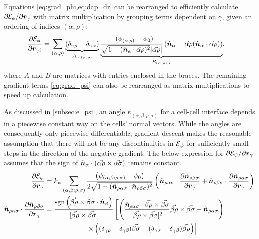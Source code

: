 Equations \cref{eq:grad_phi,eq:dap_dr} can be rearranged to efficiently calculate $\partial\mathcal{E}_\phi/\partial\bm{r}_\gamma$ with matrix multiplication by grouping terms dependent on $\gamma$, given an ordering of indices $(\alpha,\rho)$:
\begin{align}
	\frac{\partial\mathcal{E}_\phi}{\partial\bm{r}_{\gamma i}} &= \sum_{(\alpha,\rho)} \underbrace{(\delta_{\gamma\rho} - \delta_{\gamma\alpha})}_{A_{\gamma,(\alpha,\rho)}} \underbrace{\frac{-(\phi_{(\alpha,\rho)} - \phi_0)}{\sqrt{1-(\hat{\bm{n}}_\alpha \cdot \hat{\alpha\rho})^2} |\vec{\alpha\rho}|} \left(\hat{\bm{n}}_\alpha - \hat{\alpha\rho} (\hat{\bm{n}}_\alpha \cdot \hat{\alpha\rho}) \right)}_{B_{(\alpha,\rho), i}}, \label{eq:grad_phi_mx}
\end{align}
where $A$ and $B$ are matrices with entries enclosed in the braces. 
The remaining gradient terms \cref{eq:grad_psi} can also be rearranged as matrix multiplications to speed up calculation.

As discussed in \ref{subsec:e_psi}, an angle $\psi_{(\alpha, \beta: \rho, \sigma)}$ for a cell-cell interface depends in a piecewise constant way on the cells' normal vectors. While the angles are consequently only piecewise differentiable, gradient descent makes the reasonable assumption that there will not be any discontinuities in $\mathcal{E}_\psi$ for sufficiently small steps in the direction of the negative gradient. The below expression for $\partial \mathcal{E}_\psi / \partial \bm{r}_\gamma$ assumes that the sign of $\hat{\bm{n}}_\alpha \cdot (\vec{\alpha\rho}\times \vec{\alpha\sigma})$ remains constant.
\begin{align}
	\frac{\partial \mathcal{E}_\psi}{\partial \bm{r}_\gamma} &= k_\psi \sum_{(\alpha,\beta: \rho,\sigma)} \frac{\left(\psi_{(\alpha,\beta:\rho,\sigma)} - \psi_0 \right)}{2\sqrt{1 - (\hat{\bm{n}}_{\rho\alpha\sigma}\cdot \hat{\bm{n}}_{\rho\beta\sigma})^2}} \left(\hat{\bm{n}}_{\rho\alpha\sigma} \cdot \frac{\partial \hat{\bm{n}}_{\rho\beta\sigma}}{\partial \bm{r}_\gamma} + \hat{\bm{n}}_{\rho\beta\sigma} \cdot \frac{\partial \hat{\bm{n}}_{\rho\alpha\sigma}}{\partial \bm{r}_\gamma} \right) \nonumber \\
	\hat{\bm{n}}_{\rho\alpha\sigma} \cdot \frac{\partial \hat{\bm{n}}_{\rho\beta\sigma}}{\partial \bm{r}_\gamma} &= \frac{\operatorname{sgn} \left(\vec{\beta\rho} \times \vec{\beta\sigma} \cdot \hat{\bm{n}}_\beta \right)}{|\vec{\beta\rho} \times \vec{\beta\sigma}|} \left[ \left(\frac{\hat{\bm{n}}_{\rho\alpha\sigma} \cdot \vec{\beta\rho}\times\vec{\beta\sigma}}{|\vec{\beta\rho}\times\vec{\beta\sigma}|^2} \vec{\beta\rho}\times\vec{\beta\sigma} - \hat{\bm{n}}_{\rho\alpha\sigma} \right) \right. \nonumber \\
	&\qquad\qquad\qquad \left. \times \left( (\delta_{\gamma\rho} - \delta_{\gamma\beta}) \vec{\beta\sigma} - (\delta_{\gamma\sigma} - \delta_{\gamma\beta}) \vec{\beta\rho} \right) \right] \label{eq:grad_psi}
\end{align}

